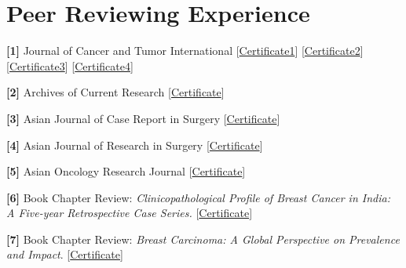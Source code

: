 \documentclass[10pt,letterpaper]{article}
\newcommand{\lk}[2]{[\href{#1}{#2}]}
\begin{document}
\section{Peer Reviewing Experience}
\textbf{[1]} Journal of Cancer and Tumor International \lk{https://drive.google.com/file/d/1h58FLV38BVJFd4Ngly_3Y_V-F3opbsV-/view?usp=sharing}{Certificate1} \lk{https://drive.google.com/file/d/1bF3GxcQvTwqvMKzYDjPdK0xZH2Q-9QRE/view?usp=sharing}{Certificate2} \lk{https://drive.google.com/file/d/15HjUQrPFB5HZVO8cGt8ltZbXImTfYXOb/view?usp=sharing}{Certificate3} \lk{https://drive.google.com/file/d/1rOhClSW2ovZWgUmtyEjgh_npgD62BjZ-/view?usp=sharing}{Certificate4}\par
\textbf{[2]} Archives of Current Research \lk{https://drive.google.com/file/d/12Ud_tFtlggTNG0q_UprFGWyBWS_2fX1Z/view?usp=sharing}{Certificate}\par
\textbf{[3]} Asian Journal of Case Report in Surgery \lk{https://drive.google.com/file/d/15GHSXhpIpMjadGQYdE5VGt6iWk6UDrgo/view?usp=sharing}{Certificate}\par
\textbf{[4]} Asian Journal of Research in Surgery \lk{https://drive.google.com/file/d/1Tn8OxOPY8EFIHFUd-Zruj9A6GnYEYQJL/view?usp=sharing}{Certificate}\par
\textbf{[5]} Asian Oncology Research Journal \lk{https://drive.google.com/file/d/10yM7iBm63XI9vLxD13SaCs3BIVj2kqsv/view?usp=sharing}{Certificate}\par
\textbf{[6]} Book Chapter Review: \textit{Clinicopathological Profile of Breast Cancer in India: A Five-year Retrospective Case Series.} \lk{https://drive.google.com/file/d/1uV54JweTS_JzuPjE2pNYkwLaPgZAQQ8v/view?usp=sharing}{Certificate}\par
\textbf{[7]} Book Chapter Review: \textit{Breast Carcinoma: A Global Perspective on Prevalence and Impact}. \lk{https://drive.google.com/file/d/1-_Y0iCUIlAubEtfYWZYgZVd5Q9n7Xt9G/view?usp=sharing}{Certificate}\par

\end{document}
